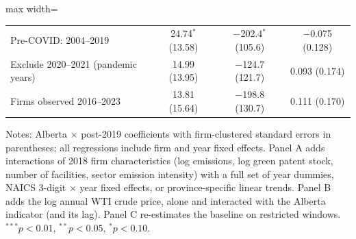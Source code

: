 \begin{table}[htbp]
\begin{adjustbox}{max width=\textwidth}
\begin{tabular}{lccc}
\quad Pre-COVID: 2004--2019 & 24.74$^{*}$ (13.58) & $-$202.4$^{*}$ (105.6) & $-$0.075 (0.128) \\
\quad Exclude 2020--2021 (pandemic years) & 14.99 (13.95) & $-$124.7 (121.7) & 0.093 (0.174) \\
\quad Firms observed 2016--2023 & 13.81 (15.64) & $-$198.8 (130.7) & 0.111 (0.170) \\
\bottomrule
\end{tabular}
\end{adjustbox}
\par\vspace{3pt}\begin{minipage}{\textwidth}\footnotesize
Notes: Alberta $\times$ post-2019 coefficients with firm-clustered standard errors in parentheses; all regressions include firm and year fixed effects. Panel A adds interactions of 2018 firm characteristics (log emissions, log green patent stock, number of facilities, sector emission intensity) with a full set of year dummies, NAICS 3-digit $\times$ year fixed effects, or province-specific linear trends. Panel B adds the log annual WTI crude price, alone and interacted with the Alberta indicator (and its lag). Panel C re-estimates the baseline on restricted windows. $^{***}p<0.01$, $^{**}p<0.05$, $^{*}p<0.10$.
\end{minipage}
\end{table}
